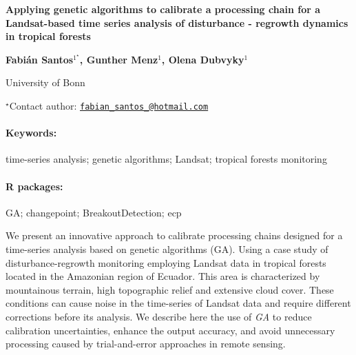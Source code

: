 \documentclass[11pt, a4paper]{article}
\renewcommand{\title}[1]{\begin{center}{\bf \LARGE #1}\end{center}}
\newcommand{\keywords}{\paragraph{Keywords:}}
\newcommand{\packages}{\paragraph{R packages:}}
\begin{document}
\pagestyle{empty}

\title{Applying genetic algorithms to calibrate a processing chain for a
Landsat-based time series analysis of disturbance - regrowth dynamics in
tropical forests}

\begin{center}
  {\bf Fabián Santos$^{1^\star}$, Gunther Menz$^{1}$, Olena Dubvyky$^{1}$}
\end{center}

\vskip 0.3cm

\begin{affiliations}
\begin{enumerate}
\begin{minipage}{0.915\textwidth}
\centering
\item University of Bonn \\[-2pt]
\end{minipage}
\end{enumerate}
$^\star$Contact author: \href{mailto:fabian_santos_@hotmail.com}{\nolinkurl{fabian\_santos\_@hotmail.com}}\\
\end{affiliations}

\vskip 0.5cm

\begin{minipage}{0.915\textwidth}
\keywords time-series analysis; genetic algorithms; Landsat; tropical forests
monitoring
\packages GA; changepoint; BreakoutDetection; ecp
\end{minipage}

\vskip 0.8cm

We present an innovative approach to calibrate processing chains
designed for a time-series analysis based on genetic algorithms (GA).
Using a case study of disturbance-regrowth monitoring employing Landsat
data in tropical forests located in the Amazonian region of Ecuador.
This area is characterized by mountainous terrain, high topographic
relief and extensive cloud cover. These conditions can cause noise in
the time-series of Landsat data and require different corrections before
its analysis. We describe here the use of \emph{GA} to reduce
calibration uncertainties, enhance the output accuracy, and avoid
unnecessary processing caused by trial-and-error approaches in remote
sensing.
\end{document}
